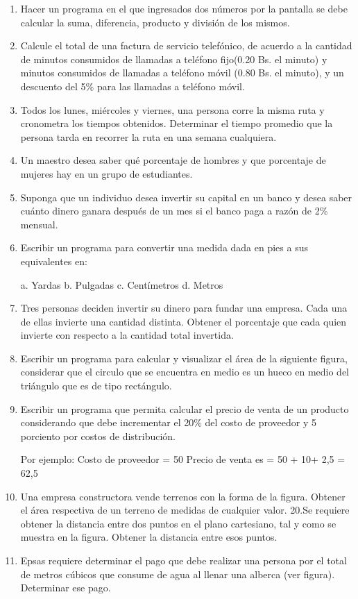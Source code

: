 \documentclass{scrartcl}
\begin{document}
\begin{enumerate}
		\item Hacer un programa en el que ingresados dos números por la pantalla se debe calcular la suma, diferencia, producto y división de los mismos.
		
		\item Calcule el total de una factura de servicio telefónico, de acuerdo a la cantidad de minutos consumidos de llamadas a teléfono fijo(0.20 Bs. el minuto) y minutos consumidos de llamadas a teléfono móvil (0.80 Bs. el minuto), y un descuento del 5\% para las llamadas a teléfono móvil.
		
		\item Todos los lunes, miércoles y viernes, una persona corre la misma ruta y cronometra los tiempos obtenidos. Determinar el tiempo promedio que la persona tarda en recorrer la ruta en una semana cualquiera.
		
		\item Un maestro desea saber qué porcentaje de hombres y que porcentaje de mujeres hay en un grupo de estudiantes.
		
		\item Suponga que un individuo desea invertir su capital en un banco y desea saber cuánto dinero ganara después de un mes si el banco paga a razón de 2\% mensual.
		
		\item Escribir un programa para convertir una medida dada en pies a sus equivalentes en:
		
		a. Yardas
		b. Pulgadas
		c. Centímetros
		d. Metros
		
		\item Tres personas deciden invertir su dinero para fundar una empresa. Cada una de ellas invierte una cantidad distinta. Obtener el porcentaje que cada quien invierte con respecto a la cantidad total invertida.
		
		\item Escribir un programa para calcular y visualizar el área de la siguiente figura, considerar que el circulo que se encuentra en medio es un hueco en medio del triángulo que es de tipo rectángulo.
		
		\item Escribir un programa que permita calcular el precio de venta de un producto considerando que debe incrementar el 20\% del costo de proveedor y 5 porciento por costos de distribución. 
		
		Por ejemplo:
		Costo de proveedor = 50
		Precio de venta es = 50 + 10+ 2,5 = 62,5
		
		\item Una empresa constructora vende terrenos con la forma de la figura. Obtener el área
		respectiva de un terreno de medidas de cualquier valor.
		20.Se requiere obtener la distancia entre dos puntos en el plano cartesiano, tal y como se muestra en la figura. Obtener la distancia entre esos puntos.
		
		\item Epsas requiere determinar el pago que debe realizar una persona por el total de metros cúbicos que consume de agua al llenar una alberca (ver figura). Determinar ese pago.

	\end{enumerate}
		
\end{document}
